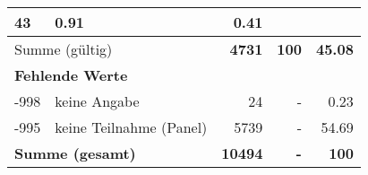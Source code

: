 \begin{longtable}{lXrrr}
       \num{43} &
       \num[round-mode=places,round-precision=2]{0,91} &
         \num[round-mode=places,round-precision=2]{0,41} \\
     \midrule
     \multicolumn{2}{l}{Summe (gültig)} &
       \textbf{\num{4731}} &
     \textbf{100} &
       \textbf{\num[round-mode=places,round-precision=2]{45,08}} \\
     \multicolumn{5}{l}{\textbf{Fehlende Werte}}\\
       -998 &
       keine Angabe &
         \num{24} &
        - &
         \num[round-mode=places,round-precision=2]{0,23} \\
       -995 &
       keine Teilnahme (Panel) &
         \num{5739} &
        - &
         \num[round-mode=places,round-precision=2]{54,69} \\
     \midrule
     \multicolumn{2}{l}{\textbf{Summe (gesamt)}} &
          \textbf{\num{10494}} &
        \textbf{-} &
        \textbf{100} \\
     \bottomrule
     \end{longtable}
     
